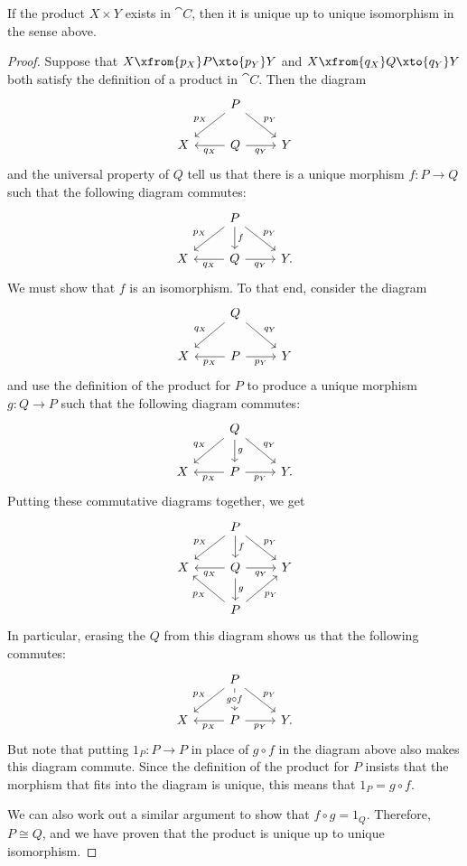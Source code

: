 \documentclass[noname]{notes}
\begin{document}
\begin{proposition}
	If the product $X \times Y$ exists in $\cat C$, then it is unique up to unique isomorphism in the sense above. 
\end{proposition}

\begin{proof}
	Suppose that $X \xfrom{p_X} P \xto{p_Y} Y$ and $X \xfrom{q_X} Q \xto{q_Y} Y$ both satisfy the definition of a product in $\cat C$. Then the diagram 
	\[
	\begin{tikzcd}
		& P \ar[dl, "p_X"'] \ar[dr, "p_Y"] \\
		X & Q \ar[l, "q_X"] \ar[r, "q_Y"'] & Y
	\end{tikzcd}
	\]
	and the universal property of $Q$ tell us that there is a unique morphism $f \colon P \to Q$ such that the following diagram commutes: 
	\[
	\begin{tikzcd}
		& P \ar[dl, "p_X"'] \ar[dr, "p_Y"] \ar[d, "f"] \\
		X & Q \ar[l, "q_X"] \ar[r, "q_Y"'] & Y.
	\end{tikzcd}
	\]
	We must show that $f$ is an isomorphism. To that end, consider the diagram 
	\[
	\begin{tikzcd}
		& Q \ar[dl, "q_X"'] \ar[dr, "q_Y"] \\
		X & P \ar[l, "p_X"] \ar[r, "p_Y"'] & Y
	\end{tikzcd}
	\]
	and use the definition of the product for $P$ to produce a unique morphism $g \colon Q \to P$ such that the following diagram commutes:
	\[
	\begin{tikzcd}
		& Q \ar[dl, "q_X"'] \ar[dr, "q_Y"] \ar[d, "g"]  \\
		X & P \ar[l, "p_X"] \ar[r, "p_Y"'] & Y.
	\end{tikzcd}
	\]
	Putting these commutative diagrams together, we get 
	\[
	\begin{tikzcd}
		& P \ar[dl, "p_X"'] \ar[dr, "p_Y"] \ar[d, "f"] \\
		X & Q \ar[l, "q_X"] \ar[r, "q_Y"'] \ar[d, "g"] & Y \\
		& P \ar[ul, "p_X"] \ar[ur, "p_Y"'] & 
	\end{tikzcd}
	\]
	In particular, erasing the $Q$ from this diagram shows us that the following commutes: 
	\[
	\begin{tikzcd}
		& P \ar[dl, "p_X"'] \ar[dr, "p_Y"] \ar[d, "g \circ f" description]  \\
		X & P \ar[l, "p_X"] \ar[r, "p_Y"'] & Y.
	\end{tikzcd}
	\]
	But note that putting $1_P \colon P \to P$ in place of $g \circ f$ in the diagram above also makes this diagram commute. Since the definition of the product for $P$ insists that the morphism that fits into the diagram is unique, this means that $1_P = g \circ f$. 
	
	We can also work out a similar argument to show that $f \circ g = 1_Q$. Therefore, $P \cong Q$, and we have proven that the product is unique up to unique isomorphism. 
\end{proof}
\end{document}
